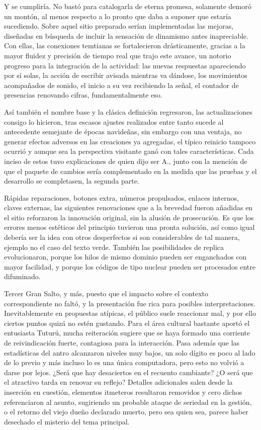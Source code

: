 \documentclass[
]{book}
\begin{document}
Y se cumpliría. No bastó para catalogarla de eterna promesa, solamente demoró un montón, al menos respecto a lo pronto que daba a suponer que estaría sucediendo. Sobre aquel sitio preparado serían implementadas las mejoras, diseñadas en búsqueda de incluir la sensación de dinamismo antes inapreciable. Con ellas, las conexiones temtianas se fortalecieron drásticamente, gracias a la mayor fluidez y precisión de tiempo real que trajo este avance, un notorio progreso para la integración de la actividad: las nuevas respuestas apareciendo por sí solas, la acción de escribir avisada mientras va dándose, los movimientos acompañados de sonido, el inicio a su vez recibiendo la señal, el contador de presencias renovando cifras, fundamentalmente eso.

Así también el nombre base y la clásica definición regresaron, las actualizaciones consigo lo hicieron, tras escasos ajustes realizados entre tanto sucede al antecedente semejante de épocas navideñas, sin embargo con una ventaja, no generar efectos adversos en las creaciones ya agregadas, el típico reinicio tampoco ocurrió y aunque sea la perspectiva visitante ganó con tales características. Cada inciso de estos tuvo explicaciones de quien dijo ser A., junto con la mención de que el paquete de cambios sería complementado en la medida que las pruebas y el desarrollo se completasen, la segunda parte.

Rápidas reparaciones, botones extra, números propulsados, enlaces internos, claves externas, las siguientes renovaciones que a la brevedad fueron añadidas en el sitio reforzaron la innovación original, sin la alusión de prosecución. Es que los errores menos estéticos del principio tuvieron una pronta solución, así como igual debería ser la idea con otros desperfectos si son considerables de tal manera, ejemplo no el caso del texto verde. También las posibilidades de replica evolucionaron, porque los hilos de mismo dominio pueden ser enganchados con mayor facilidad, y porque los códigos de tipo nuclear pueden ser procesados entre difuminado.

Tercer Gran Salto, y más, puesto que el impacto sobre el contexto correspondiente no faltó, y la presentación fue rica para posibles interpretaciones. Inevitablemente en propuestas atípicas, el público suele reaccionar mal, y por ello ciertos puntos quizá no estén gustando. Para el área cultural bastante aportó el entusiasta Tuturú, mucha reiteración sugiere que se haya formado una corriente de reivindicación fuerte, contagiosa para la interacción. Pasa además que las estadísticas del antro alcanzaron niveles muy bajos, un solo dígito es poco al lado de lo previo y más incluso lo es una única computadora, pero esto no volvió a darse por lejos. ¿Será que hay desaciertos en el recuento cambiante? ¿O será que el atractivo tarda en renovar su reflejo? Detalles adicionales salen desde la inserción en cuestión, elementos itmeteros resultaron removidos y cero dichos referenciaron al asunto, sugiriendo un probable ataque de seriedad en la gestión, o el retorno del viejo dueño declarado muerto, pero sea quien sea, parece haber desechado el misterio del tema principal.
\end{document}
